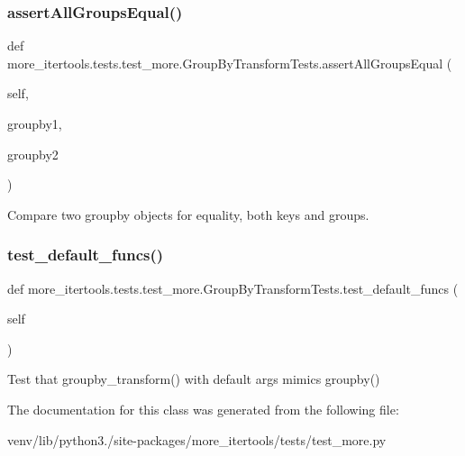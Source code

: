 \subsubsection{\texorpdfstring{assert\+All\+Groups\+Equal()}{assertAllGroupsEqual()}}
{\footnotesize\ttfamily def more\+\_\+itertools.\+tests.\+test\+\_\+more.\+Group\+By\+Transform\+Tests.\+assert\+All\+Groups\+Equal (\begin{DoxyParamCaption}\item[{}]{self,  }\item[{}]{groupby1,  }\item[{}]{groupby2 }\end{DoxyParamCaption})}

\begin{DoxyVerb}Compare two groupby objects for equality, both keys and groups.\end{DoxyVerb}
 \mbox{\label{classmore__itertools_1_1tests_1_1test__more_1_1_group_by_transform_tests_a0e94b9a37b07e1cba2cf77cf94db0fb3}} 
\subsubsection{\texorpdfstring{test\+\_\+default\+\_\+funcs()}{test\_default\_funcs()}}
{\footnotesize\ttfamily def more\+\_\+itertools.\+tests.\+test\+\_\+more.\+Group\+By\+Transform\+Tests.\+test\+\_\+default\+\_\+funcs (\begin{DoxyParamCaption}\item[{}]{self }\end{DoxyParamCaption})}

\begin{DoxyVerb}Test that groupby_transform() with default args mimics groupby()\end{DoxyVerb}
 

The documentation for this class was generated from the following file\+:\begin{DoxyCompactItemize}
\item 
venv/lib/python3./site-\/packages/more\+\_\+itertools/tests/test\+\_\+more.\+py\end{DoxyCompactItemize}
